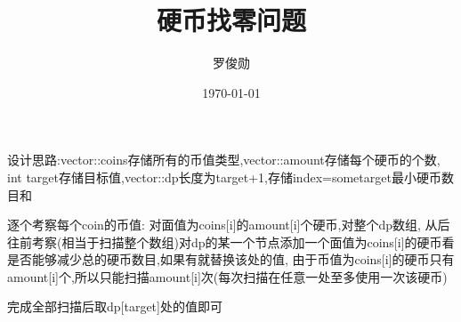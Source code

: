 \documentclass[12pt, a4paper, oneside]{ctexart}
\title{\huge\textbf{硬币找零问题}}
\author{罗俊勋}
\date{\today}
\begin{document}
\maketitle

设计思路:vector::coins存储所有的币值类型,vector::amount存储每个硬币的个数,\\int target存储目标值,vector::dp长度为target+1,存储index=sometarget最小硬币数目和

逐个考察每个coin的币值:
对面值为coins[i]的amount[i]个硬币,对整个dp数组,
从后往前考察(相当于扫描整个数组)对dp的某一个节点添加一个面值为coins[i]的硬币看是否能够减少总的硬币数目,如果有就替换该处的值,
由于币值为coins[i]的硬币只有amount[i]个,所以只能扫描amount[i]次(每次扫描在任意一处至多使用一次该硬币)

完成全部扫描后取dp[target]处的值即可
\end{document}
